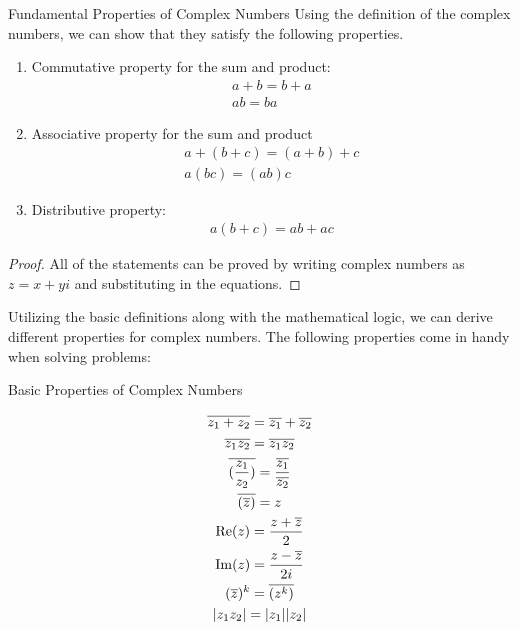 \begin{propbox}{Fundamental Properties of Complex Numbers}
	Using the definition of the complex numbers, we can show that they satisfy the following properties. \\
	
	\begin{enumerate}
	
		\item Commutative property for the sum and product: 
		\begin{gather}
		a + b = b + a \\
		ab = ba
		\end{gather}
		
		\item Associative property for the sum and product
		\begin{gather}
		a + (b+c) = (a+b) + c \\
		a(bc) = (ab)c
		\end{gather}
		
		\item Distributive property:
		\begin{gather}
		a (b+c) = ab + ac
		\end{gather}
	
	\end{enumerate}
\end{propbox}

\begin{proof}
	All of the statements can be proved by writing complex numbers as $z = x+yi$ and substituting in the equations.
\end{proof}

Utilizing the basic definitions along with the mathematical logic, we can derive different properties for complex numbers. The following properties come in handy when solving problems:

\begin{propbox}{Basic Properties of Complex Numbers}
	
	\begin{gather}
	\overline{z_1 + z_2} = \overline{z_1} + \overline{z_2} \\
	\overline{z_1 z_2} = \overline{z_1} \overline{z_2} \\
	\overline{(\frac{z_1}{z_2})} = \frac{\overline{z_1}}{\overline{z_2}}  \\
	\overline{(\overline{z})} = z \\
	\operatorname{Re}(z) = \frac{z + \overline{z}}{2} \\
	\operatorname{Im}(z) = \frac{z - \overline{z}}{2i} \\
	(\overline{z})^k = \overline{(z^k)} \\  
	|z_1 z_2| = |z_1||z_2|
	\end{gather}

\end{propbox}

